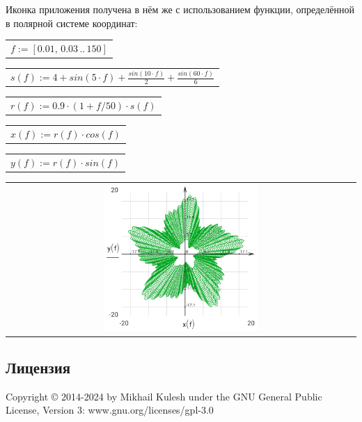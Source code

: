 \documentclass[DIV=calc, paper=a4, fontsize=11pt, twocolumn]{scrartcl}
\begin{document}
Иконка приложения получена в нём же
с использованием функции,
определённой в полярной системе
координат:
\begin{center}\begin{tabular}{c}
                $f := \left[ 0.01,\, 0.03 \,..\, 150 \right]$
\end{tabular}\end{center}
\begin{center}\begin{tabular}{c}
                $s(f) := 4 + sin \left( 5 \cdot f\right)  + \frac{sin \left( 10 \cdot f\right) }{2} + \frac{sin \left( 60 \cdot f\right) }{6}$
\end{tabular}\end{center}
\begin{center}\begin{tabular}{c}
                $r(f) := 0.9 \cdot \left( 1 + f / 50 \right) \cdot s \left( f\right) $
\end{tabular}\end{center}
\begin{center}\begin{tabular}{c}
                $x(f) := r \left( f\right)  \cdot cos \left( f\right) $
\end{tabular}\end{center}
\begin{center}\begin{tabular}{c}
                $y(f) := r \left( f\right)  \cdot sin \left( f\right) $
\end{tabular}\end{center}
\begin{center}\begin{tabular}{c} \includegraphics[width=0.45\textwidth]{graphics/about_micromath_fig1.png} \end{tabular}\end{center}

\subsection*{Лицензия}

Copyright © 2014-2024 by Mikhail
Kulesh under the GNU General
Public License, Version 3:
www.gnu.org/licenses/gpl-3.0
\end{document}
